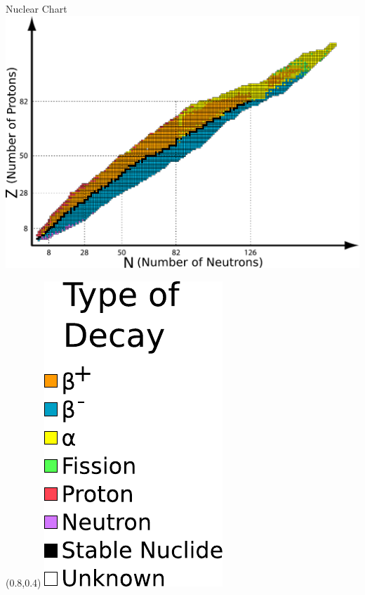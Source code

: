 \documentclass{beamer}
\begin{document}
\begin{frame}{Nuclear Chart}
    \centering
    \hspace*{0.65em}
    \includegraphics[scale=0.53]{assets/chart}
    \begin{textblock*}{0.1\paperwidth}(0.8\paperwidth,0.4\paperheight)
        \includegraphics[scale=0.5]{assets/legend}
    \end{textblock*}
\end{frame}
\end{document}
